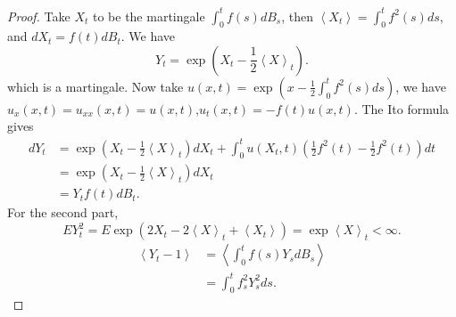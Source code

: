 \begin{proof}
	Take $X_t$ to be the martingale $\int _0^t f(s) d B_s$, then $\left\langle X_t \right\rangle  = \int _0^t f^2 (s) ds$, and $dX_t = f(t) d B_t$. We have
	\[
		Y_t = \exp\left( X_t - \frac{1}{2} \left\langle X \right\rangle _t \right) 
	.\] 
	which is a martingale. Now take $u(x, t) = \exp\left( x - \frac{1}{2}\int _0^t f^2 (s) ds \right) $, we have $u_x(x, t) = u_{x x}(x, t) = u(x, t)$,$u_t(x, t) = - f(t) u(x,t)$. The Ito formula gives
	\begin{align*}
		dY_t &= \exp\left( X_t - \frac{1}{2} \left\langle X \right\rangle _t \right) d X_t + \int _0^t u(X_t, t) \left( \frac{1}{2} f^2(t) - \frac{1}{2} f^2(t) \right) dt\\
		&=  \exp\left( X_t - \frac{1}{2} \left\langle X \right\rangle _t \right) d X_t\\
		&=  Y_t f(t) d B_t
	.\end{align*} 
	For the second part,
	\[
		EY_t^2 = E \exp\left( 2 X_t - 2 \left\langle X \right\rangle _t + \left\langle X_t \right\rangle  \right) 
		= \exp \left\langle X \right\rangle _t < \infty 
	.\] 
	 \begin{align*}
		\left\langle Y_t -1  \right\rangle 
		&= \left\langle \int _0^t f(s) Y_s d B_s \right\rangle  \\
		&= \int _0^t f_s^2 Y_s^2 ds
	.\end{align*}
\end{proof}

